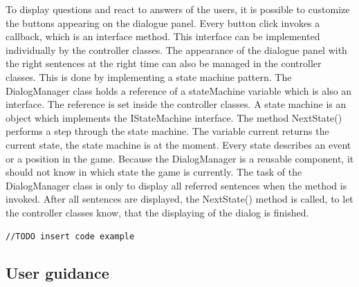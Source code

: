 To display questions and react to answers of the users, it is possible to customize the buttons appearing on the dialogue panel. Every button click invokes a callback, which is an interface method. This interface can be implemented individually by the controller classes. The appearance of the dialogue panel with the right sentences at the right time can also be managed in the controller classes. This is done by implementing a state machine pattern. The DialogManager class holds a reference of a stateMachine variable which is also an interface. The reference is set inside the controller classes. A state machine is an object which implements the IStateMachine interface. The method NextState() performs a step through the state machine. The variable current returns the current state, the state machine is at the moment. Every state describes an event or a position in the game. Because the DialogManager is a reusable component, it should not know in which state the game is currently. The task of the DialogManager class is only to display all referred sentences when the method is invoked. After all sentences are displayed, the NextState() method is called, to let the controller classes know, that the displaying of the dialog is finished. 
\begin{lstlisting} 
//TODO insert code example
\end{lstlisting}
\subsection{User guidance}
